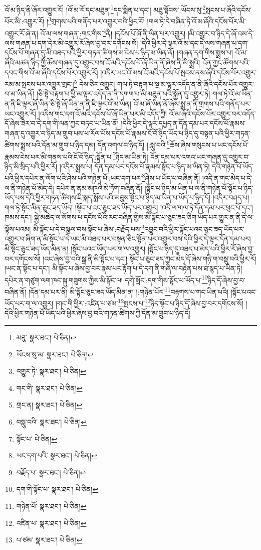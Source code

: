 འོ་མ་ཉིད་ནི་ཞོར་འགྱུར་རོ། །འོ་མ་རོ་དང་མཐུན་\footnote{མཐུ་  སྣར་ཐང་།  པེ་ཅིན། }དང་སྨིན་པ་དང་། མཐུ་སྟོབས་:ཡོངས་སུ་\footnote{ཡོངས་སུ་མ་  སྣར་ཐང་།  པེ་ཅིན། }སྤངས་པ་ཞོའི་དངོས་པོར་མི་:འགྱུར་རོ། །\footnote{འགྱུར་ཏེ་  སྣར་ཐང་།  པེ་ཅིན། }གྲགས་པའི་གནོད་པར་འགྱུར་བའི་ཕྱིར་རོ། །གལ་ཏེ་དེ་བཞིན་ཏེ་འོ་མ་ཞོའི་དངོས་པོར་མི་འགྱུར་རོ་ཞེ་ན། འོ་མ་ལས་གཞན་:གང་གིས་\footnote{གང་གི་  སྣར་ཐང་།  པེ་ཅིན། }ནི། །དངོས་པོ་ཞོ་ནི་ཡིན་པར་འགྱུར། །མི་འགྱུར་བ་ཉིད་དེ་ཞོ་འམ་དེ་ལས་གཞན་པ་དག་དེར་མི་འགྱུར་རོ་ཞེས་བྱ་བར་དགོངས་སོ། །དེའི་ཕྱིར་དེ་ལྟར་འོ་མ་དང་དེ་ལས་གཞན་པ་དག་དངོས་པོ་གཞན་དུ་མི་འཐད་པའི་ཕྱིར་གཏན་ཚིགས་མ་ངེས་པ་ཉིད་མ་ཡིན་ནོ། །གཞན་དག་གིས་སྨྲས་པ། འོ་མ་ཞོའི་མཚན་ཉིད་ཀྱི་ཆོས་གཞན་དུ་འགྱུར་བས་འོ་མའི་དངོས་པོ་ཞོ་ཡིན་ནོ་ཞེས་ནི་མི་སྨྲའི། འོན་ཀྱང་ཚོགས་པའི་དབང་གིས་འོ་མ་ཞོའི་དངོས་པོར་འགྱུར་རོ། །འདིར་ཡང་འོ་མས་འོ་མའི་དངོས་པོ་སྤངས་ནས་ཞོའི་དངོས་པོར་འགྱུར་རམ་མ་སྤངས་པར་འགྱུར་གྲང་།\footnote{གྲང་ན།  སྣར་ཐང་།  པེ་ཅིན། } དེས་ཅིར་འགྱུར། གལ་ཏེ་བརྟག་པ་སྔ་མ་ལྟར་འདོད་ན་ནི་ཞོའི་དངོས་པོར་འགྱུར་བ་མ་ཡིན་ནོ། །ཅི་སྟེ་བརྟག་པ་ཕྱི་མ་ལྟར་འདོད་ན་ནི་དགག་པ་མི་མཐུན་པའི་སྐྱོན་དུ་འགྱུར་ཏེ། གལ་ཏེ་འོ་མ་ཡིན་ན་ནི་ཇི་ལྟར་ཞོ་ཡིན་ཅི་སྟེ་ཞོ་ཡིན་ན་ནི་ཇི་ལྟར་འོ་མ་ཡིན། འོ་མ་ཞོ་ཡིན་ནོ་ཞེས་སྨྲ་ན་ནི་གྲགས་པའི་གནོད་པར་ཡང་འགྱུར་རོ། །འདིས་གང་དག་འོ་མའི་དངོས་པོ་ཞོ་ཡིན་པར་མི་འདོད་ཀྱི། འོ་མ་ཞོའི་དངོས་པོར་འགྱུར་བར་འདོད་དོ་ཞེས་ཟེར་བ་དེ་དག་གི་ལན་ཀྱང་བཏབ་པ་ཡིན་ནོ། །དེའི་ཕྱིར་དེ་ལྟར་དཔྱད་ན་དོན་དམ་པར་དངོས་པོ་རྣམས་གཞན་དུ་འགྱུར་བ་ཉིད་མ་གྲུབ་པས་ཕ་རོལ་པོས་དངོས་པོ་རྣམས་ངོ་བོ་ཉིད་ཡོད་པ་ཉིད་དུ་བསྟན་པའི་ཕྱིར་གཏན་ཚིགས་སྨྲས་པའི་དོན་མ་གྲུབ་པ་ཉིད་དམ། དོན་འགལ་བ་ཉིད་དོ། །:སླུ་བའི་\footnote{བསླུ་བའི་  སྣར་ཐང་།  པེ་ཅིན། }ཆོས་ཞེས་གསུངས་པ་ཡང་དངོས་པོ་རྣམས་ངེས་པར་མི་གནས་པའི་ངོ་བོ་ཉིད་:སྟོན་པ་\footnote{སྟོང་པ་  པེ་ཅིན། }ཉིད་མ་ཡིན་ཏེ། དོན་དམ་པར་འགའ་ཡང་གཞན་དུ་འགྱུར་བ་ཉིད་མི་སྲིད་པའི་ཕྱིར་རོ། །འདིར་སྨྲས་པ། དོན་དམ་པར་དངོས་པོ་རྣམས་སྟོང་པ་ཉིད་མ་ཡིན་ཏེ། དེའི་གཉེན་པོ་ཡོད་པའི་ཕྱིར་དཔེར་ན་ལོག་པའི་ཤེས་པའི་གཉེན་པོ་:ཡང་དག་པར་\footnote{ཡང་དག་པའི་  སྣར་ཐང་།  པེ་ཅིན། }ཤེས་པ་ཡོད་པ་བཞིན་ནོ། །འདི་ན་གང་མེད་པ་དེ་ལ་ནི་གཉེན་པོ་མེད་དེ། དཔེར་ན་ནམ་མཁའི་མེ་ཏོག་བཞིན་ནོ། །སྟོང་པ་ཉིད་མ་ཡིན་པ་ལ་ནི་གཉེན་པོ་སྟོང་པ་ཉིད་ཡོད་པས་དེའི་ཕྱིར་གཏན་ཚིགས་ཇི་སྐད་སྨོས་པའི་མཐུས་སྟོང་པ་ཉིད་མ་ཡིན་པ་ཡོད་པ་ཉིད་དོ། །འདིར་བཤད་པ། གལ་ཏེ་སྟོང་མིན་ཅུང་ཟད་ཡོད། །སྟོང་པ་འང་ཅུང་ཟད་ཡོད་པར་འགྱུར། །འདི་ལ་གལ་ཏེ་དོན་དམ་པར་ཕུང་པོ་དང་། ཁམས་དང་། སྐྱེ་མཆེད་ལ་སོགས་པ་དངོས་པོའི་རང་བཞིན་གྱིས་མི་སྟོང་པ་ཅུང་ཟད་ཅིག་ཡོད་པར་གྱུར་ན་ནི་དེ་ལ་ལྟོས་པའམ། མི་སྟོང་པ་དེ་བསྩལ་བས་སྟོང་པ་ཞེས་:བརྗོད་པས་\footnote{བརྗོད་པ་  སྣར་ཐང་།  པེ་ཅིན། }འབྱུང་བའི་ཕྱིར་སྟོང་པའང་ཅུང་ཟད་ཡོད་པར་འགྱུར་བ་ཞིག་ན་མི་སྟོང་པ་དེ་ཡང་མི་འཐད་པར་བསྟན་ཅིང་སྟོན་པར་འགྱུར་བས་དེའི་ཕྱིར་དེ་ལྟར་དོན་དམ་པར། མི་སྟོང་ཅུང་ཟད་ཡོད་མིན་ན། །སྟོང་པའང་ཡོད་པར་ག་ལ་འགྱུར། །སྟོང་པ་ཉིད་དུ་འཐད་པ་མེད་པའི་ཕྱིར་རོ་ཞེས་བྱ་བར་དགོངས་སོ། །འང་ཞེས་བྱ་བའི་སྒྲ་ནི་མི་སྟོང་པ་དང་། སྟོང་པ་ཅུང་ཟད་ཀྱང་མེད་དོ་ཞེས་གཉི་ག་བསྡུ་བའི་ཕྱིར་རོ། །ཡང་ན་སྟོང་པ་དང་། མི་སྟོང་པ་ཞེས་བྱ་བར་རྣམ་པར་རྟོག་པ་དེ་དག་ནི་གཞི་ལ་བརྟེན་པས་ཐ་སྙད་པ་ཡིན་ཏེ། དཔེར་ན་གཙུག་ལག་ཁང་སྐུ་གཟུགས་ཀྱིས་མི་སྟོང་ལ། དགེ་སློང་:དག་གིས་སྟོང་པ་ཡོད་པ་\footnote{དག་གི་སྟོང་པ་  སྣར་ཐང་།  པེ་ཅིན། }ཉིད་དོ་ཞེས་བྱ་བ་བཞིན་ནོ། །དོན་དམ་པར་ནི། མི་སྟོང་ཅུང་ཟད་ཡོད་མིན་ན། །:གཉེན་པོར་\footnote{གཉེན་པོ་  སྣར་ཐང་།  པེ་ཅིན། }བརྟགས་པ་གང་ཡིན་པའི། །སྟོང་པའང་ཡོད་པར་ག་ལ་འགྱུར། །གང་གི་ཕྱིར་:འཛིན་པ་ཙམ་\footnote{འཛིན་པ་  སྣར་ཐང་།  པེ་ཅིན། }སྤངས་པ་\footnote{པ་ཙམ་  སྣར་ཐང་།  པེ་ཅིན། }ཉིད་སྟོང་པ་ཉིད་དོ་ཞེས་བྱ་བར་དགོངས་སོ། །དེའི་ཕྱིར་གཉེན་པོ་ཡོད་པའི་ཕྱིར་ཞེས་བྱ་བའི་གཏན་ཚིགས་ཀྱི་དོན་མ་གྲུབ་པ་ཉིད་དོ། 